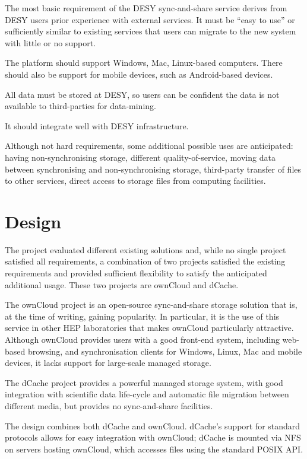 \documentclass[a4paper]{jpconf}
\begin{document}
The most basic requirement of the DESY sync-and-share service derives
from DESY users prior experience with external services.  It must be
``easy to use'' or sufficiently similar to existing services that
users can migrate to the new system with little or no support.

The platform should support Windows, Mac, Linux-based computers.
There should also be support for mobile devices, such as Android-based
devices.

All data must be stored at DESY, so users can be confident the data is
not available to third-parties for data-mining.

It should integrate well with DESY infrastructure.

Although not hard requirements, some additional possible uses are
anticipated: having non-synchronising storage, different
quality-of-service, moving data between synchronising and
non-synchronising storage, third-party transfer of files to other
services, direct access to storage files from computing facilities.

\section{Design}

The project evaluated different existing solutions and, while no
single project satisfied all requirements, a combination of two
projects satisfied the existing requirements and provided sufficient
flexibility to satisfy the anticipated additional usage.  These two
projects are ownCloud and dCache.

The ownCloud project is an open-source sync-and-share storage solution
that is, at the time of writing, gaining popularity.  In particular,
it is the use of this service in other HEP laboratories that makes
ownCloud particularly attractive.  Although ownCloud provides users
with a good front-end system, including web-based browsing, and
synchronisation clients for Windows, Linux, Mac and mobile devices, it
lacks support for large-scale managed storage.

The dCache project provides a powerful managed storage system, with
good integration with scientific data life-cycle and automatic file
migration between different media, but provides no sync-and-share
facilities.

The design combines both dCache and ownCloud.  dCache's support for
standard protocols allows for easy integration with ownCloud; dCache
is mounted via NFS\cite{rfc5661} on servers hosting ownCloud, which
accesses files using the standard POSIX API.
\end{document}
